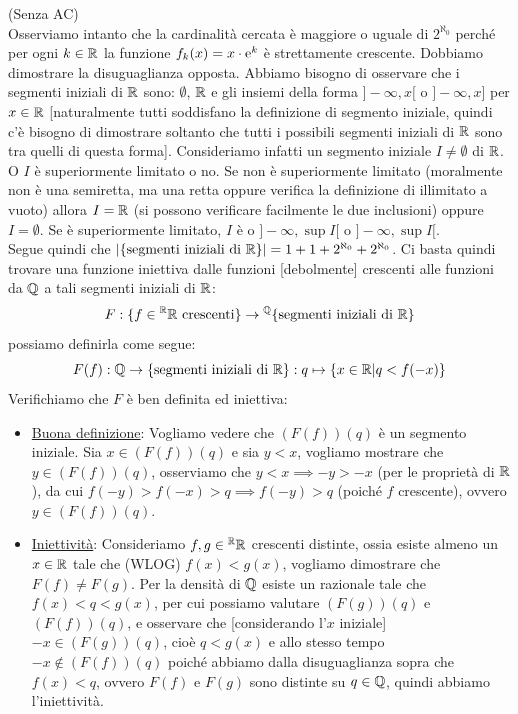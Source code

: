 \begin{soln}
	(Senza AC)\\
	Osserviamo intanto che la cardinalit\`a cercata \`e maggiore o uguale di $2^{\aleph_0}$ perch\'e per ogni $k \in \mathbb R$ la funzione $f_k(x) = x \cdot \text{e}^{k}$ \`e strettamente crescente. Dobbiamo dimostrare la disuguaglianza opposta.
	Abbiamo bisogno di osservare che i segmenti iniziali di $\mathbb R$ sono: $\emptyset$, $\mathbb R$ e gli insiemi della forma $]-\infty,x[$ o $]-\infty,x]$ per $x \in \mathbb R$ [naturalmente tutti soddisfano la definizione di segmento iniziale, quindi c'\`e bisogno di dimostrare soltanto che tutti i possibili segmenti iniziali di $\mathbb R$ sono tra quelli di questa forma].
	Consideriamo infatti un segmento iniziale $I \ne \emptyset$ di $\mathbb R$. O $I$ \`e superiormente limitato o no. Se non \`e superiormente limitato (moralmente non \`e una semiretta, ma una retta oppure verifica la definizione di illimitato a vuoto) allora $I = \mathbb R$ (si possono verificare facilmente le due inclusioni) oppure $I = \emptyset$. Se \`e superiormente limitato, $I$ \`e o $]-\infty,\sup I[$ o $]-\infty,\sup I[$.\\
	Segue quindi che $|\{\text{segmenti iniziali di $\mathbb R$}\}| = 1 + 1 + 2^{\aleph_0} + 2^{\aleph_0}$. Ci basta quindi trovare una funzione iniettiva dalle funzioni [debolmente] crescenti alle funzioni da $\mathbb Q$ a tali segmenti iniziali di $\mathbb R$:
	\[ F : \{\text{$f \in {}^\mathbb R \mathbb R$ crescenti}\} \to {}^\mathbb Q\{\text{segmenti iniziali di $\mathbb R$}\}
		\]
	possiamo definirla come segue:
	\[ F(f) : \mathbb Q \to \{\text{segmenti iniziali di $\mathbb R$}\} : q \mapsto \{x \in \mathbb R | q < f(-x)\}
		\]
	Verifichiamo che $F$ \`e ben definita ed iniettiva:
	\begin{itemize}
		\item[$\diamondsuit$] \underline{Buona definizione}: Vogliamo vedere che $(F(f))(q)$ \`e un segmento iniziale. Sia $x \in (F(f))(q)$ e sia $y < x$, vogliamo mostrare che $y \in (F(f))(q)$, osserviamo che $y < x \implies -y > -x$ (per le propriet\`a di $\mathbb R$), da cui $f(-y) > f(-x) > q \implies f(-y) > q$ (poich\'e $f$ crescente), ovvero $y \in (F(f))(q)$.
		\item[$\diamondsuit$] \underline{Iniettivit\`a}: Consideriamo $f,g \in {}^\mathbb R\mathbb R$ crescenti distinte, ossia esiste almeno un $x \in \mathbb R$ tale che (WLOG) $f(x) < g(x)$, vogliamo dimostrare che $F(f) \ne F(g)$. Per la densit\`a di $\mathbb Q$ esiste un razionale tale che $f(x) < q < g(x)$, per cui possiamo valutare $(F(g))(q)$ e $(F(f))(q)$, e osservare che [considerando l'$x$ iniziale] $-x \in (F(g))(q)$, cio\`e $q < g(x)$ e allo stesso tempo $-x \not \in (F(f))(q)$ poich\'e abbiamo dalla disuguaglianza sopra che $f(x) < q$, ovvero $F(f)$ e $F(g)$ sono distinte su $q \in \mathbb Q$,
		quindi abbiamo l'iniettivit\`a.
	\end{itemize}
\end{soln}

